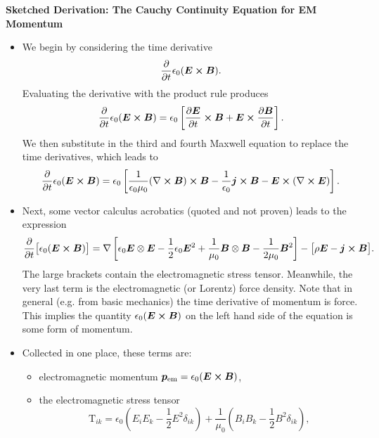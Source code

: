 \documentclass[11pt, a4paper]{article}
\renewcommand{\vec}[1]{\bm{#1}} %
\newcommand{\E}{\vec{E}} %
\newcommand{\B}{\vec{B}} %
\newcommand{\TT}{\mathrm{T}}  %
\newcommand{\ee}{\epsilon_{0}}  %
\newcommand{\mm}{\mu_{0}}  %
\renewcommand{\j}{\vec{j}}  %
\renewcommand{\curl}{\nabla \cross}
\renewcommand{\grad}{\nabla}
\begin{document}
\textbf{Sketched Derivation: The Cauchy Continuity Equation for EM Momentum}
\begin{itemize}
	\item We begin by considering the time derivative
	\begin{equation*}
		\pdv{t}\ee (\E \cross \B).
	\end{equation*}
	Evaluating the derivative with the product rule produces
	\begin{equation*}
		\pdv{t}\ee (\E \cross \B) = \ee \left[\pdv{\E}{t}\cross \B + \E \cross \pdv{\B}{t}\right].
	\end{equation*}
	We then substitute in the third and fourth Maxwell equation to replace the time derivatives, which leads to
	\begin{equation*}
		\pdv{t}\ee (\E \cross \B) = \ee \left[\frac{1}{\ee \mm}(\curl \B)\cross \B - \frac{1}{\ee}\j \cross \B - \E \cross (\curl \E)\right].
	\end{equation*}
	
    \item Next, some vector calculus acrobatics (quoted and not proven) leads to the expression
	\begin{equation*}
		\pdv{t}\big[\ee (\E \cross \B)\big] = \grad \left[\ee \E \otimes \E - \frac{1}{2}\ee \E^{2} + \frac{1}{\mm} \B \otimes \B - \frac{1}{2\mm}\B^{2}\right] - \big[\rho \E - \j \cross \B\big].
	\end{equation*}
	The large brackets contain the electromagnetic stress tensor. Meanwhile, the very last term is the electromagnetic (or Lorentz) force density. Note that in general (e.g. from basic mechanics) the time derivative of momentum is force. This implies the quantity $ \ee (\E \cross \B) $ on the left hand side of the equation is some form of momentum.
	
	\item Collected in one place, these terms are:
    \begin{itemize}
        \item electromagnetic momentum $ \vec{p}_{\text{em}} = \ee (\E \cross \B) $,

        \item the electromagnetic stress tensor 
        \begin{equation*}
            \TT_{ik} = \ee \left(E_{i}E_{k} - \frac{1}{2}E^{2}\delta_{ik}\right) + \frac{1}{\mm}\left(B_{i}B_{k} - \frac{1}{2}B^{2}\delta_{ik}\right),
        \end{equation*}
        

\end{itemize}
\end{itemize}
\end{document}
